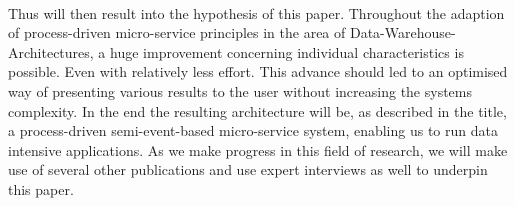 \\
Thus will then result into the hypothesis of this paper. Throughout the adaption of process-driven micro-service principles in the area of Data-Warehouse-Architectures, a huge improvement concerning individual characteristics is possible. Even with relatively less effort. This advance should led to an optimised way of presenting various results to the user without increasing the systems complexity.\newline 
In the end the resulting architecture will be, as described in the title, a process-driven semi-event-based micro-service system, enabling us to run data intensive applications. \newline
As we make progress in this field of research, we will make use of several other publications and use expert interviews as well to underpin this paper. 